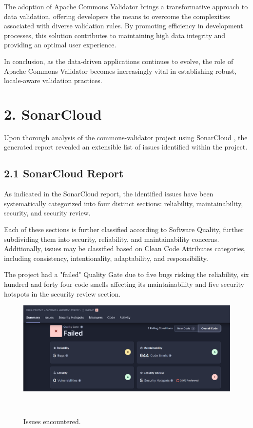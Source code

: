 \documentclass{sigchi}
\begin{document}
The adoption of Apache Commons Validator brings a transformative approach to data validation, offering developers the means to overcome the complexities associated with diverse validation rules. By promoting efficiency in development processes, this solution contributes to maintaining high data integrity and providing an optimal user experience. 

In conclusion, as the data-driven applications continues to evolve, the role of Apache Commons Validator becomes increasingly vital in establishing robust, locale-aware validation practices.


\section{2. SonarCloud}
Upon thorough analysis of the commons-validator project using SonarCloud \cite{sonarcloud}, the generated report revealed an extensible list of issues identified within the project.

\subsection{2.1 SonarCloud Report}
As indicated in the SonarCloud report, the identified issues have been systematically categorized into four distinct sections: reliability, maintainability, security, and security review. 

Each of these sections is further classified according to Software Quality, further subdividing them into security, reliability, and maintainability concerns. Additionally, issues may be classified based on Clean Code Attributes categories, including consistency, intentionality, adaptability, and responsibility.

The project had a "failed" Quality Gate due to five bugs risking the reliability, six hundred and forty four code smells affecting its maintainability and five security hotspots in the security review section. 

\begin{figure}[h!]
\centering
  \includegraphics[width=1\columnwidth]{sonarcloudFail.png}
  \caption{Issues encountered.}~\label{fig:figure1}
\end{figure}
\end{document}
